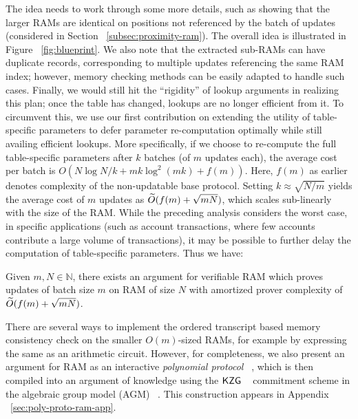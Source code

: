 The idea needs to work through some more details, such as showing that the larger RAMs are identical
on positions not referenced by the batch of updates (considered in Section ~\ref{subsec:proximity-ram}).
The overall idea is illustrated in Figure ~\ref{fig:blueprint}. We also note that the extracted sub-RAMs can
have duplicate records, corresponding to multiple updates referencing the same RAM index; however, memory
checking methods can be easily adapted to handle such cases. Finally, we would still hit the ``rigidity'' of lookup arguments
in realizing this plan; once the table has changed, lookups are no longer efficient from it. To circumvent this,
we use our first contribution on extending the utility of table-specific parameters to defer parameter
re-computation optimally while still availing efficient lookups. More specifically, if we choose to
re-compute the full table-specific parameters after $k$ batches (of $m$ updates each),
the average cost per batch is $O(N\log N/k + mk\log^2(mk) + f(m))$. Here, $f(m)$ as earlier denotes complexity
of the non-updatable base protocol. Setting $k\approx \sqrt{N/m}$ yields the average cost of $m$ updates as $\widetilde{O}(f(m)+\sqrt{mN})$,
which scales sub-linearly with the size of the RAM.
While the preceding analysis considers the worst case,
in specific applications (such as account transactions, where few accounts contribute a large volume of transactions), it may be
possible to further delay the computation of table-specific parameters.
Thus we have:
\begin{theorem}[Informal]\label{thm:inc-ver-ram-informal}
	Given $m,N\in \mathbb{N}$, there exists an argument for verifiable RAM which proves updates of batch size $m$ on RAM of size $N$
	with amortized prover complexity of $\widetilde{O}(f(m) + \sqrt{mN})$.
\end{theorem}


 There are several ways to implement the ordered transcript based
memory consistency check on the smaller $O(m)$-sized RAMs, for example by expressing the same as an arithmetic
circuit. However, for completeness, we also present an argument for RAM as an
interactive {\em polynomial protocol} ~\cite{Gabizon2019PLONKPO}, which is then compiled into an argument of knowledge using the $\mathsf{KZG}$ ~\cite{AC:KatZavGol10}
commitment scheme in the algebraic group model (AGM) ~\cite{C:FucKilLos18}. This construction appears in
Appendix ~\ref{sec:poly-proto-ram-app}.

